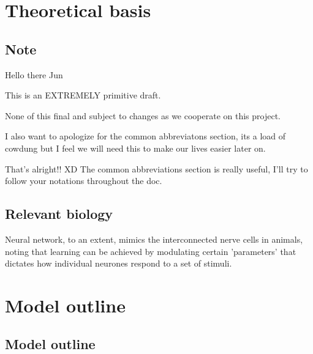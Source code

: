 \documentclass[a4paper, 12pt]{report}
\theoremstyle{definition}
\begin{document}
\newpage

\chapter{Theoretical basis}
\section{Note}
Hello there Jun

\noindent
This is an \textsc{\huge EXTREMELY} primitive draft.

\noindent
None of this final and subject to changes as we cooperate on this project.

\noindent
I also want to apologize for the common abbreviatons section, its a load of cowdung
but I feel we will need this to make our lives easier later on.

\par That's alright!! XD The common abbreviations section is really useful, I'll try to follow your notations
throughout the doc.

\section{Relevant biology}
Neural network, to an extent, mimics the interconnected nerve cells in animals, noting that learning can be achieved by modulating certain
'parameters' that dictates how individual neurones respond to a set of stimuli.

\chapter{Model outline}
\section{Model outline}
\end{document}

